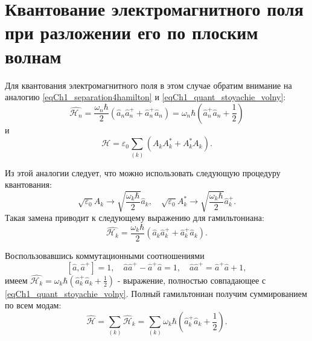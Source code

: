 \section{Квантование электромагнитного поля при разложении его по
  плоским волнам}
Для квантования электромагнитного поля в этом случае обратим внимание
на аналогию \eqref{eqCh1_separation4hamilton} и
\eqref{eqCh1_quant_stoyachie_volny}:
\[
\hat{\mathcal{H}_n} = 
\frac{\omega_n \hbar}{2}
\left(\hat{a}_n \hat{a}_n^{+} + \hat{a}_n^{+} \hat{a}_n\right)
=
\omega_n \hbar 
\left(\hat{a}_n^{+} \hat{a}_n + \frac{1}{2}\right)
\]
и
\[
\mathcal{H} = \varepsilon_0 \sum_{(k)} 
\left(A_k A_k^{*} + A_k^{*} A_k \right).
\]

Из этой аналогии следует, что можно использовать следующую процедуру
квантования:
\[
\sqrt{\varepsilon_0}A_k \rightarrow \sqrt{\frac{\omega_k \hbar}{2}}
\hat{a}_k, \quad
\sqrt{\varepsilon_0}A_k^{*} \rightarrow \sqrt{\frac{\omega_k \hbar}{2}}
\hat{a}_k^{+}.
\]
Такая замена приводит к следующему выражению для гамильтониана:
\[
\hat{\mathcal{H}_k} = \frac{\omega_k \hbar}{2} 
\left(\hat{a}_k \hat{a}_k^{+} + \hat{a}_k^{+} \hat{a}_k\right).
\]

Воспользовавшись коммутационными соотношениями
\[
\left[\hat{a}, \hat{a}^{+} \right] = 1, \quad
\hat{a} \hat{a}^{+} - \hat{a}^{+}\hat{a} = 1, \quad
\hat{a} \hat{a}^{+} = \hat{a}^{+}\hat{a} + 1,
\]
имеем
\(
\hat{\mathcal{H}_k} = \omega_k \hbar 
\left(\hat{a}_k^{+} \hat{a}_k + \frac{1}{2}\right)
\) - 
выражение, полностью совпадающее с \eqref{eqCh1_quant_stoyachie_volny}.
Полный гамильтониан получим суммированием по всем модам:
\begin{equation}
\hat{\mathcal{H}} = \sum_{(k)} \hat{\mathcal{H}}_k = \sum_{(k)} 
\omega_k \hbar \left(\hat{a}_k^{+} \hat{a}_k + \frac{1}{2}\right).
\end{equation}

